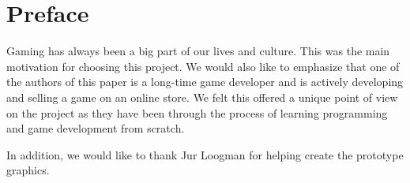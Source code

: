 \chapter*{Preface}
\thispagestyle{empty}

Gaming has always been a big part of our lives and culture. 
This was the main motivation for choosing this project.
We would also like to emphasize that one of the authors of this paper is a long-time game developer and is actively developing and selling a game on an online store. 
We felt this offered a unique point of view on the project as they have been through the process of learning programming and game development from scratch. 

In addition, we would like to thank Jur Loogman for helping create the \dazel{} prototype graphics.
